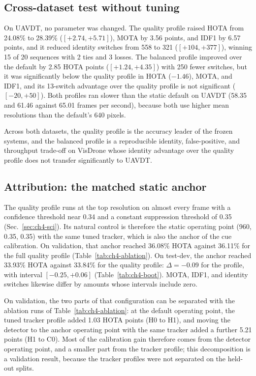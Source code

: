 \subsection{Cross-dataset test without tuning}
On UAVDT, no parameter was changed. The quality profile raised HOTA from 24.08\% to 28.39\% ($[+2.74, +5.71]$), MOTA by 3.56 points, and IDF1 by 6.57 points, and it reduced identity switches from 558 to 321 ($[+104, +377]$), winning 15 of 20 sequences with 2 ties and 3 losses. The balanced profile improved over the default by 2.85 HOTA points ($[+1.24, +4.35]$) with 250 fewer switches, but it was significantly below the quality profile in HOTA ($-1.46$), MOTA, and IDF1, and its 13-switch advantage over the quality profile is not significant ($[-20, +50]$). Both profiles ran slower than the static default on UAVDT (58.35 and 61.46 against 65.01 frames per second), because both use higher mean resolutions than the default's 640 pixels.

Across both datasets, the quality profile is the accuracy leader of the frozen systems, and the balanced profile is a reproducible identity, false-positive, and throughput trade-off on VisDrone whose identity advantage over the quality profile does not transfer significantly to UAVDT.

\subsection{Attribution: the matched static anchor}
The quality profile runs at the top resolution on almost every frame with a confidence threshold near 0.34 and a constant suppression threshold of 0.35 (Sec.~\ref{sec:ch4-sci}). Its natural control is therefore the static operating point (960, 0.35, 0.35) with the same tuned tracker, which is also the anchor of the cue calibration. On validation, that anchor reached 36.08\% HOTA against 36.11\% for the full quality profile (Table~\ref{tab:ch4-ablation}). On test-dev, the anchor reached 33.93\% HOTA against 33.84\% for the quality profile: $\Delta=-0.09$ for the profile, with interval $[-0.25, +0.06]$ (Table~\ref{tab:ch4-boot}). MOTA, IDF1, and identity switches likewise differ by amounts whose intervals include zero.

On validation, the two parts of that configuration can be separated with the ablation runs of Table~\ref{tab:ch4-ablation}: at the default operating point, the tuned tracker profile added 1.03 HOTA points (H0 to H1), and moving the detector to the anchor operating point with the same tracker added a further 5.21 points (H1 to C0). Most of the calibration gain therefore comes from the detector operating point, and a smaller part from the tracker profile; this decomposition is a validation result, because the tracker profiles were not separated on the held-out splits.

